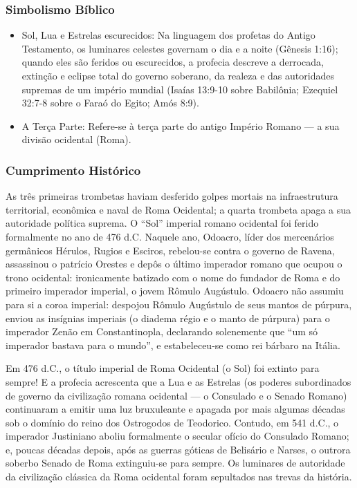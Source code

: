 \subsubsection*{Simbolismo Bíblico}
\begin{itemize}
  \item Sol, Lua e Estrelas escurecidos: Na linguagem dos profetas do Antigo Testamento, os luminares celestes governam o dia e a noite (Gênesis 1:16); quando eles são feridos ou escurecidos, a profecia descreve a derrocada, extinção e eclipse total do governo soberano, da realeza e das autoridades supremas de um império mundial (Isaías 13:9-10 sobre Babilônia; Ezequiel 32:7-8 sobre o Faraó do Egito; Amós 8:9).
  \item A Terça Parte: Refere-se à terça parte do antigo Império Romano — a sua divisão ocidental (Roma).
\end{itemize}



\subsubsection*{Cumprimento Histórico}
As três primeiras trombetas haviam desferido golpes mortais na infraestrutura territorial, econômica e naval de Roma Ocidental; a quarta trombeta apaga a sua autoridade política suprema.
O ``Sol'' imperial romano ocidental foi ferido formalmente no ano de 476 d.C. Naquele ano, Odoacro, líder dos mercenários germânicos Hérulos, Rugios e Esciros, rebelou-se contra o governo de Ravena, assassinou o patrício Orestes e depôs o último imperador romano que ocupou o trono ocidental: ironicamente batizado com o nome do fundador de Roma e do primeiro imperador imperial, o jovem Rômulo Augústulo. Odoacro não assumiu para si a coroa imperial: despojou Rômulo Augústulo de seus mantos de púrpura, enviou as insígnias imperiais (o diadema régio e o manto de púrpura) para o imperador Zenão em Constantinopla, declarando solenemente que ``um só imperador bastava para o mundo'', e estabeleceu-se como rei bárbaro na Itália.

Em 476 d.C., o título imperial de Roma Ocidental (o Sol) foi extinto para sempre!
E a profecia acrescenta que a Lua e as Estrelas (os poderes subordinados de governo da civilização romana ocidental — o Consulado e o Senado Romano) continuaram a emitir uma luz bruxuleante e apagada por mais algumas décadas sob o domínio do reino dos Ostrogodos de Teodorico. Contudo, em 541 d.C., o imperador Justiniano aboliu formalmente o secular ofício do Consulado Romano; e, poucas décadas depois, após as guerras góticas de Belisário e Narses, o outrora soberbo Senado de Roma extinguiu-se para sempre. Os luminares de autoridade da civilização clássica da Roma ocidental foram sepultados nas trevas da história.




